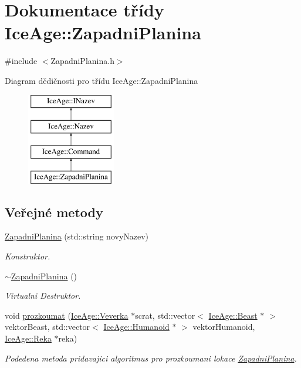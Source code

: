 \hypertarget{classIceAge_1_1ZapadniPlanina}{}\section{Dokumentace třídy Ice\+Age\+:\+:Zapadni\+Planina}
\label{classIceAge_1_1ZapadniPlanina}


{\ttfamily \#include $<$Zapadni\+Planina.\+h$>$}

Diagram dědičnosti pro třídu Ice\+Age\+:\+:Zapadni\+Planina\begin{figure}[H]
\begin{center}
\leavevmode
\includegraphics[height=4.000000cm]{db/d02/classIceAge_1_1ZapadniPlanina}
\end{center}
\end{figure}
\subsection*{Veřejné metody}
\begin{DoxyCompactItemize}
\item 
\hyperlink{classIceAge_1_1ZapadniPlanina_a00bed05e6c94978be3a6ab06097fb7f5}{Zapadni\+Planina} (std\+::string novy\+Nazev)
\begin{DoxyCompactList}\small\item\em Konstruktor. \end{DoxyCompactList}\item 
\hyperlink{classIceAge_1_1ZapadniPlanina_a232195b066da4fa8eaa4e6524de6954d}{$\sim$\+Zapadni\+Planina} ()
\begin{DoxyCompactList}\small\item\em Virtualni Destruktor. \end{DoxyCompactList}\item 
void \hyperlink{classIceAge_1_1ZapadniPlanina_a328d18a38647899a301125ac42ac9fd3}{prozkoumat} (\hyperlink{classIceAge_1_1Veverka}{Ice\+Age\+::\+Veverka} $\ast$scrat, std\+::vector$<$ \hyperlink{classIceAge_1_1Beast}{Ice\+Age\+::\+Beast} $\ast$ $>$ vektor\+Beast, std\+::vector$<$ \hyperlink{classIceAge_1_1Humanoid}{Ice\+Age\+::\+Humanoid} $\ast$ $>$ vektor\+Humanoid, \hyperlink{classIceAge_1_1Reka}{Ice\+Age\+::\+Reka} $\ast$reka)
\begin{DoxyCompactList}\small\item\em Podedena metoda pridavajici algoritmus pro prozkoumani lokace \hyperlink{classIceAge_1_1ZapadniPlanina}{Zapadni\+Planina}. \end{DoxyCompactList}\end{DoxyCompactItemize}
